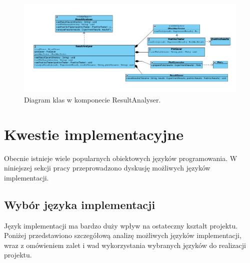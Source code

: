 \documentclass[12pt]{article}
\begin{document}
\begin{figure}[!h]
\centering
	\includegraphics[width=1.2\textwidth]{img/class_diagrams/result_analyser.png}
	\caption{Diagram klas w komponecie ResultAnalyser.}
	\label{fig:classResultAnalyser}
\end{figure}
\newpage


\section{Kwestie implementacyjne}

Obecnie istnieje wiele popularnych obiektowych języków programowania. W niniejszej sekcji pracy przeprowadzono dyskusję możliwych języków implementacji.

\subsection{Wybór języka implementacji}

Język implementacji ma bardzo duży wpływ na ostateczny kształt projektu. Poniżej przedstawiono szczegółową analizę możliwych języków implementacji, wraz z omówieniem zalet i wad wykorzystania wybranych języków do realizacji projektu.
\end{document}
